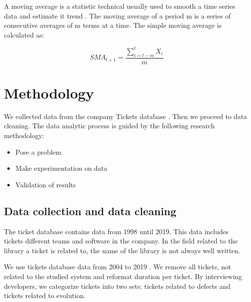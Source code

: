 \documentclass[10pt,conference]{IEEEtran}
\begin{document}
A moving average is a statistic technical usually used to smooth a time series data and estimate it trend \cite{MOLU17}.
 The moving average of a period m is a series of consecutive averages of m terms at a time. 
 The simple moving average is calculated as:

\begin{equation}
SMA_{t+1}=\frac{\sum\limits_{i=t-m}^t X_i}{m}
\end{equation}

\section{Methodology}
\label{sec:methodology}

We collected data  from the company Tickets database .  
Then we proceed to data cleaning.
The data analytic process is guided by the following research methodology:
\begin{itemize}
\item Pose a problem
\item Make experimentation on data
\item Validation of results
\end{itemize}

\subsection{Data collection and data cleaning}

The ticket database contains data from 1998  until 2019. 
This data includes tickets  different teams and software in  the company. 
In the field related to the  library a ticket is related to,  the name of the library is not always well written. 

We use tickets database data from 2004 to 2019 . 
We  remove all tickets, not related  to the studied system and reformat duration per ticket.
By interviewing developers, we categorize tickets into two sets: tickets related to defects and tickets related to evolution.
\end{document}
